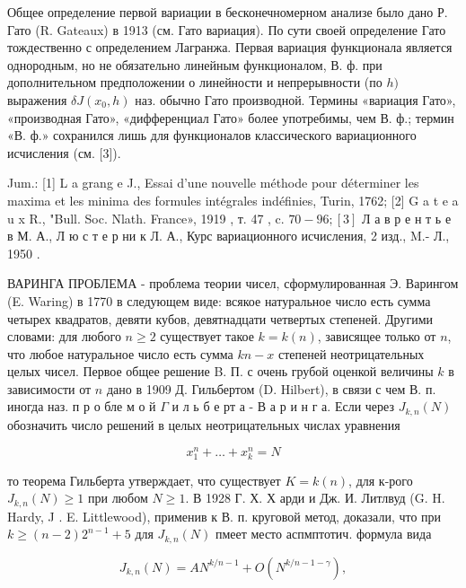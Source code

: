 \documentclass[10pt]{article}
\begin{document}
Общее определение первой вариации в бесконечномерном анализе было дано Р. Гато (R. Gateaux) в 1913 (см. Гато вариация). По сути своей определение Гато тождественно с определением Лагранжа. Первая вариация функционала является однородным, но не обязательно линейным функционалом, В. ф. при дополнительном предположении о линейности и непрерывности (по $h)$ выражения $\delta J\left(x_{0}, h\right)$ наз. обычно Гато производной. Термины «вариация Гато», «производная Гато», «дифференциал Гато» более употребимы, чем В. ф.; термин «В. ф.» сохранился лишь для функционалов классического вариационного исчисления (см. [3]).



Jum.: [1] L a grang e J., Essai d'une nouvelle méthode pour déterminer les maxima et les minima des formules intégrales indéfinies, Turin, 1762; [2] G a t e a u x R., "Bull. Soc. Nlath. France», 1919 , т. 47 , c. $70-96 ;[3]$ Л а в р е н т ь е в М. А., Л ю с т е р ни к Л. А., Курс вариационного исчисления, 2 изд., M.- Л., 1950 .



ВАРИНГА ПРОБЛЕМА - проблема теории чисел, сформулированная Э. Варингом (E. Waring) в 1770 в следующем виде: всякое натуральное число есть сумма четырех квадратов, девяти кубов, девятнадцати четвертых степеней. Другими словами: для любого $n \geqslant 2$ существует такое $k=k(n)$, зависящее только от $n$, что любое натуральное число есть сумма $k n-x$ степеней неотрицательных целых чисел. Первое общее решение B. П. с очень грубой оценкой величины $k$ в зависимости от $n$ дано в 1909 Д. Гильбертом (D. Hilbert), в связи с чем В. п. иногда наз. п р о бле м о й $\Gamma$ и л ь б е рт а - В а р и н г а. Если через $J_{k, n}(N)$ обозначить число решений в целых неотрицательных числах уравнения



\[

x_{1}^{n}+\ldots+x_{k}^{n}=N

\]



то теорема Гильберта утверждает, что существует $K=k(n)$, для к-рого $J_{k, n}(N) \geqslant 1$ при любом $N \geqslant 1$. В 1928 Г. Х. Х арди и Дж. И. Литлвуд (G. H. Hardy, J . E. Littlewood), применив к В. п. круговой метод, доказали, что при $k \geqslant(n-2) 2^{n-1}+5$ для $J_{k, n}(N)$ пмеет место аспмптотич. формула вида



\[

J_{k, n}(N)=A N^{k / n-1}+O\left(N^{k / n-1-\gamma}\right),

\]
\end{document}
